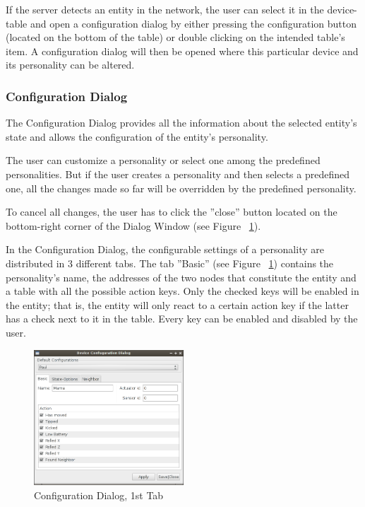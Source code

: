 If the server detects an entity in the network, the user can select it in the device-table and open a configuration dialog by either pressing the configuration button (located on the bottom of the table) or double clicking on the intended table's item. A configuration dialog will then be opened where this particular device and its personality can be altered.

\subsubsection{Configuration Dialog}

The Configuration Dialog provides all the information about the selected entity's state and allows the configuration of the entity's personality. 

The user can customize a personality or select one among the predefined personalities. But if the user creates a personality and then selects a predefined one, all the changes made so far will be overridden by the predefined personality. 

To cancel all changes, the user has to click the ''close'' button located on the bottom-right corner of the Dialog Window (see Figure ~\ref{fig:java-server-config01}).   

In the Configuration Dialog, the configurable settings of a personality are distributed in 3 different tabs. The tab ''Basic'' (see Figure ~\ref{fig:java-server-config01}) contains the personality's name, the addresses of the two nodes that constitute the entity and a table with all the possible action keys. Only the checked keys will be enabled in the entity; that is, the entity will only react to a certain action key if the latter has a check next to it in the table. Every key can be enabled and disabled by the user. 


\begin{figure}[h!]
 \centering
 \includegraphics[width= 0.5\textwidth, clip=true  ,keepaspectratio=true]{./pic/java-server-config01.png}
 \caption{Configuration Dialog, 1st Tab}
 \label{fig:java-server-config01}
\end{figure}

